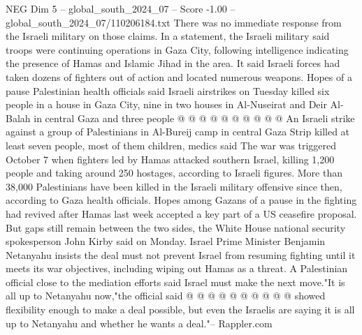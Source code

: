 \begin{textsample}{NEG Dim 5 – global\_south\_2024\_07 – Score -1.00 – global\_south\_2024\_07/110206184.txt}
There was no immediate response from the Israeli military on those claims.
In a statement, the Israeli military said troops were continuing operations in Gaza City, following intelligence indicating the presence of Hamas and Islamic Jihad in the area.
It said Israeli forces had taken dozens of fighters out of action and located numerous weapons.
Hopes of a pause Palestinian health officials said Israeli airstrikes on Tuesday killed six people in a house in Gaza City, nine in two houses in Al-Nuseirat and Deir Al-Balah in central Gaza and three people @ @ @ @ @ @ @ @ @ @ An Israeli strike against a group of Palestinians in Al-Bureij camp in central Gaza Strip killed at least seven people, most of them children, medics said The war was triggered October 7 when fighters led by Hamas attacked southern Israel, killing 1,200 people and taking around 250 hostages, according to Israeli figures.
More than 38,000 Palestinians have been killed in the Israeli military offensive since then, according to Gaza health officials.
Hopes among Gazans of a pause in the fighting had revived after Hamas last week accepted a key part of a US ceasefire proposal.
But gaps still remain between the two sides, the White House national security spokesperson John Kirby said on Monday.
Israel Prime Minister Benjamin Netanyahu insists the deal must not prevent Israel from resuming fighting until it meets its war objectives, including wiping out Hamas as a threat.
A Palestinian official close to the mediation efforts said Israel must make the next move."It is all up to Netanyahu now,"the official said @ @ @ @ @ @ @ @ @ @ showed flexibility enough to make a deal possible, but even the Israelis are saying it is all up to Netanyahu and whether he wants a deal."-- Rappler.com

\end{textsample}
